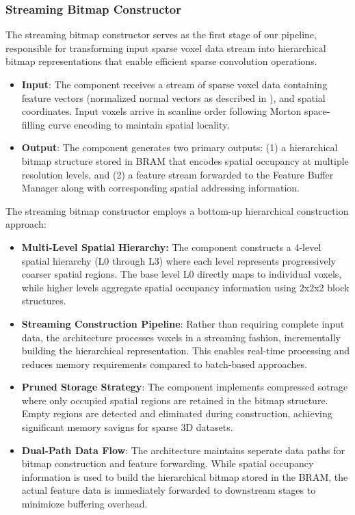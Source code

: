 \documentclass[sigconf, screen]{acmart}
\begin{document}
\subsubsection{Streaming Bitmap Constructor}
The streaming bitmap constructor serves as the first stage of our pipeline, responsible for transforming input sparse voxel data stream into hierarchical bitmap representations that enable efficient sparse convolution operations.
\begin{itemize}
    \item \textbf{Input}: The component receives a stream of sparse voxel data containing feature vectors (normalized normal vectors as described in \cite{ocnnoriginal}), and spatial coordinates. Input voxels arrive in scanline order following Morton space-filling curve encoding to maintain spatial locality.
    \item \textbf{Output}: The component generates two primary outputs: (1) a hierarchical bitmap structure stored in BRAM that encodes spatial occupancy at multiple resolution levels, and (2) a feature stream forwarded to the Feature Buffer Manager along with corresponding spatial addressing information.
\end{itemize}
The streaming bitmap constructor employs a bottom-up hierarchical construction approach:
\begin{itemize}
    \item \textbf{Multi-Level Spatial Hierarchy:} The component constructs a 4-level spatial hierarchy (L0 through L3) where each level represents progressively coarser spatial regions. The base level L0 directly maps to individual voxels, while higher levels aggregate spatial occupancy information using 2x2x2 block structures.
    \item \textbf{Streaming Construction Pipeline}: Rather than requiring complete input data, the architecture processes voxels in a streaming fashion, incrementally building the hierarchical representation. This enables real-time processing and reduces memory requirements compared to batch-based approaches.
    \item \textbf{Pruned Storage Strategy}: The component implements compressed sotrage where only occupied spatial regions are retained in the bitmap structure. Empty regions are detected and eliminated during construction, achieving significant memory savigns for sparse 3D datasets.
    \item \textbf{Dual-Path Data Flow}: The architecture maintains seperate data paths for bitmap construction and feature forwarding. While spatial occupancy information is used to build the hierarchical bitmap stored in the BRAM, the actual feature data is immediately forwarded to downstream stages to minimioze buffering overhead.
\end{itemize}
\end{document}
